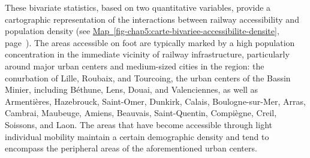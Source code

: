 \begin{refsegment}

These bivariate statistics, based on two quantitative variables, provide a cartographic representation of the interactions between railway accessibility and population density (see \hyperref[fig-chap5:carte-bivariee-accessibilite-densite]{Map~\ref{fig-chap5:carte-bivariee-accessibilite-densite}}, page~\pageref{fig-chap5:carte-bivariee-accessibilite-densite}). The areas accessible on foot are typically marked by a high population concentration in the immediate vicinity of railway infrastructure, particularly around major urban centers and medium-sized cities in the region: the \gls{conurbation} of Lille, Roubaix, and Tourcoing, the urban centers of the Bassin Minier, including Béthune, Lens, Douai, and Valenciennes, as well as Armentières, Hazebrouck, Saint-Omer, Dunkirk, Calais, Boulogne-sur-Mer, Arras, Cambrai, Maubeuge, Amiens, Beauvais, Saint-Quentin, Compiègne, Creil, Soissons, and Laon. The areas that have become accessible through light individual mobility maintain a certain demographic density and tend to encompass the peripheral areas of the aforementioned urban centers.%


\end{refsegment}
